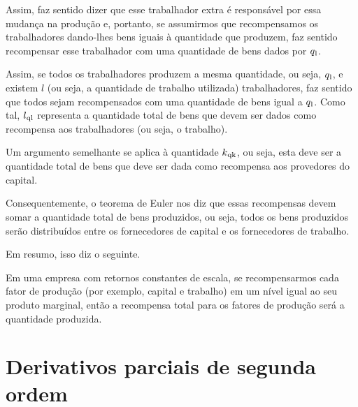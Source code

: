 \documentclass[a4paper]{article}
\begin{document}
\par Assim, faz sentido dizer que esse trabalhador extra é responsável por essa mudança na produção e, portanto, se assumirmos que recompensamos os trabalhadores dando-lhes bens iguais à quantidade que produzem, faz sentido recompensar esse trabalhador com uma quantidade de bens dados por $q\textsubscript{l}$.

\par Assim, se todos os trabalhadores produzem a mesma quantidade, ou seja, $q\textsubscript{l}$, e existem $l$ (ou seja, a quantidade de trabalho utilizada) trabalhadores, faz sentido que todos sejam recompensados com uma quantidade de bens igual a $q\textsubscript{l}$. Como tal, $l\textsubscript{ql}$ representa a quantidade total de bens que devem ser dados como recompensa aos trabalhadores (ou seja, o trabalho).

\par Um argumento semelhante se aplica à quantidade $k\textsubscript{qk}$, ou seja, esta deve ser a quantidade total de bens que deve ser dada como recompensa aos provedores do capital.

\par Consequentemente, o teorema de Euler nos diz que essas recompensas devem somar a quantidade total de bens produzidos, ou seja, todos os bens produzidos serão distribuídos entre os fornecedores de capital e os fornecedores de trabalho.

\par Em resumo, isso diz o seguinte.

\par Em uma empresa com retornos constantes de escala, se recompensarmos cada fator de produção (por exemplo, capital e trabalho) em um nível igual ao seu produto marginal, então a recompensa total para os fatores de produção será a quantidade produzida.
\section{Derivativos parciais de segunda ordem}
\end{document}
